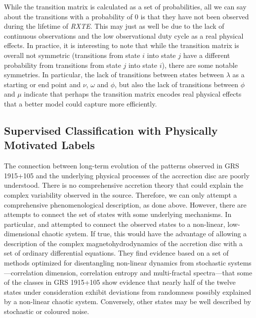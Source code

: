 \documentclass[12pt]{emulateapj}
\newcommand{\project}[1]{\textsl{#1}}
\newcommand{\rxte}{\project{RXTE}}
\begin{document}
While the transition matrix is calculated as a set of probabilities, all we can say about the transitions with a probability of $0$ is that they have not been observed 
during the lifetime of \rxte. This may just as well be due to the lack of continuous observations and the low observational duty cycle as a real physical effects.
In practice, it is interesting to note that while the transition matrix is overall not symmetric (transitions from state $i$ into state $j$ have a different probability from 
transitions from state $j$ into state $i$), there are some notable symmetries. In particular, the lack of transitions between states between $\lambda$ as a starting 
or end point and $\nu$, $\omega$ and $\phi$, but also the lack of transitions between $\phi$ and $\mu$ indicate that perhaps the transition matrix encodes 
real physical effects that a better model could capture more efficiently.

\subsection{Supervised Classification with Physically Motivated Labels}

The connection between long-term evolution of the patterns observed in GRS 1915+105 and the underlying physical processes of the 
accrection disc are poorly understood. There is no comprehensive accretion theory that could explain the complex variability observed in the source. 
Therefore, we can only attempt a comprehensive phenomenological description, as done above.
However, there are attempts to connect the set of 
states with some underlying mechanisms. In particular, \citet{misra2004,misra2006} and \citet{harikrishnan2011} attempted to connect the observed states to 
a non-linear, low-dimensional chaotic system. If true, this would have the advantage of allowing a description of the complex magnetohydrodynamics of the 
accretion disc with a set of ordinary differential equations. They find evidence based on a set of methods optimized for disentangling non-linear dynamics from 
stochastic systems---correlation dimension, correlation entropy and multi-fractal spectra---that some of the classes in GRS 1915+105 show evidence that nearly 
half of the twelve states under consideration exhibit deviations from randomness possibly explained by a non-linear chaotic system. Conversely, other states may 
be well described by stochastic or coloured noise.
\end{document}
